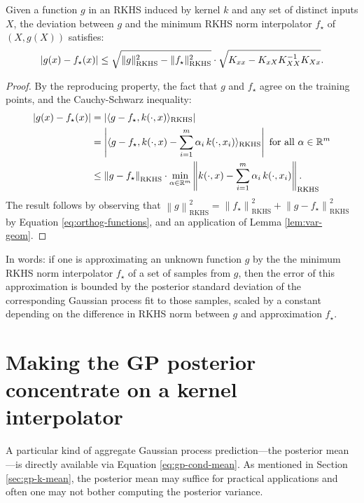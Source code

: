 \begin{refsection}
\begin{theorem} Given a function $g$ in an RKHS induced by kernel $k$ and any set of distinct inputs $X$, the deviation between $g$ and the minimum RKHS norm interpolator $f_\star$ of $(X,g(X))$ satisfies:
\begin{equation}
    \vert {g(x) - f_{\star}(x)} \vert \leq \sqrt{\Vert {g} \Vert_\mathrm{RKHS}^2-\Vert {f_\star} \Vert_\mathrm{RKHS}^2} \cdot \sqrt{K_{xx} - K_{xX}K_{XX}^{-1}K_{Xx}}.
\end{equation}
\end{theorem}
\begin{proof} By the reproducing property, the fact that $g$ and $f_\star$ agree on the training points, and the Cauchy-Schwarz inequality:
    \begin{align*}
        \abs{g(x) - f_{\star}(x)} &= \left|\langle g - f_\star, k(\cdot,x)\rangle_\mathrm{RKHS}\right| \\
        &= \left|\langle g - f_\star, k(\cdot,x) - \sum_{i=1}^m \alpha_i\,k(\cdot,x_i)\rangle_\mathrm{RKHS}\right| \text{ for all } \alpha\in\R^m\\
        &\leq \left\|g-f_\star\right\|_\mathrm{RKHS} \cdot \min_{\alpha\in\R^m} \left\|k(\cdot,x) - \sum_{i=1}^m \alpha_i\,k(\cdot,x_i)\right\|_{\mathrlap{\mathrm{RKHS}}}.
    \end{align*}
    The result follows by observing that $\left\|g\right\|_\mathrm{RKHS}^2 = \left\|f_\star\right\|_\mathrm{RKHS}^2 +  \left\|g-f_\star\right\|_\mathrm{RKHS}^2$ by Equation \ref{eq:orthog-functions}, and an application of Lemma \ref{lem:var-geom}.
\end{proof}

In words: if one is approximating an unknown function $g$ by the the minimum RKHS norm interpolator $f_\star$ of a set of samples from $g$, then the error of this approximation is bounded by the posterior standard deviation of the corresponding Gaussian process fit to those samples, scaled by a constant depending on the difference in RKHS norm between $g$ and approximation $f_\star$.

\section{Making the GP posterior concentrate on a kernel interpolator}

A particular kind of aggregate Gaussian process prediction---the posterior mean---is directly available via Equation \ref{eq:gp-cond-mean}. As mentioned in Section \ref{sec:gp-k-mean}, the posterior mean may suffice for practical applications and often one may not bother computing the posterior variance.


\end{refsection}
